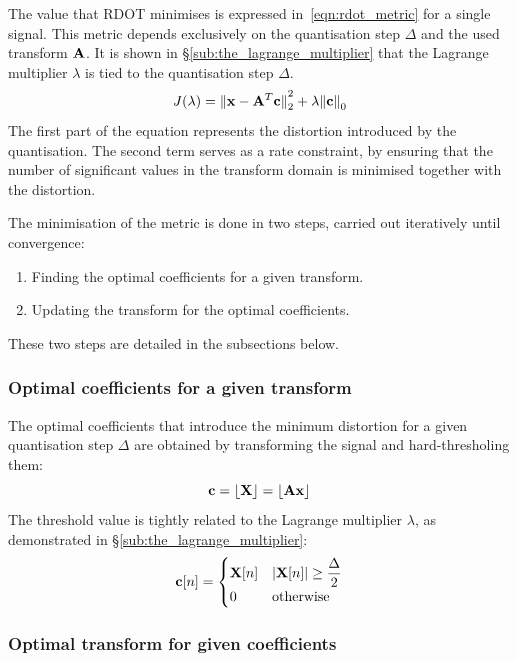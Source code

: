 \documentclass[11pt,a4paper,openright,twoside]{book}
\numberwithin{equation}{section} %
\numberwithin{figure}{section} %
\numberwithin{table}{section} %
\begin{document}
The value that \ac{RDOT} minimises is expressed in~\eqref{eqn:rdot_metric} for
a single signal.
This metric depends exclusively on the quantisation step $\Delta$ and the
used transform $\mathbf{A}$.
It is shown in \S\ref{sub:the_lagrange_multiplier} that the Lagrange
multiplier $\lambda$ is tied to the quantisation step $\Delta$.
\begin{equation}
	J (\lambda) =
	{\Vert \mathbf{x} - \mathbf{A}^T \mathbf{c} \Vert}_2^2 + \lambda{\Vert \mathbf{c}\Vert}_0
	\label{eqn:rdot_metric}
\end{equation}
The first part of the equation represents the distortion introduced by
the quantisation.
The second term serves as a rate constraint, by ensuring that the number of
significant values in the transform domain is minimised together with the
distortion.

The minimisation of the metric is done in two steps, carried out iteratively
until convergence:
\begin{enumerate}
	\item Finding the optimal coefficients for a given transform.
	\item Updating the transform for the optimal coefficients.
\end{enumerate}

These two steps are detailed in the subsections below.
\subsubsection{Optimal coefficients for a given transform}
\label{ssub:optimal_coefficients_for_a_given_transform}

The optimal coefficients that introduce the minimum distortion for a given
quantisation step $\Delta$ are obtained by transforming the signal and
hard-thresholing them:
\begin{equation}
	\mathbf{c} = \lfloor \mathbf{X} \rfloor = \lfloor \mathbf{A} \mathbf{x} \rfloor
\end{equation}
The threshold value is tightly related to the Lagrange multiplier $\lambda$,
as demonstrated in \S\ref{sub:the_lagrange_multiplier}:
\begin{equation}
	\mathbf{c}[n] =
	\begin{cases}
		\mathbf{X}[n] & \vert \mathbf{X}[n] \vert \ge \displaystyle \frac{\Delta}{2} \\
		0     & \text{otherwise} \\
	\end{cases}
	\label{eqn:hard_threshold}
\end{equation}

\subsubsection{Optimal transform for given coefficients}
\label{ssub:optimal_transform_for_given_coefficients}
\end{document}
